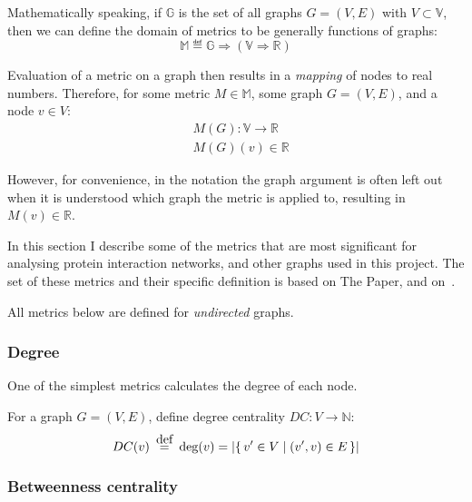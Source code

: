 Mathematically speaking, if $\mathbb{G}$ is the set of all graphs $G = (V, E)$ with $V \subset \mathbb{V}$, then we can define the domain of metrics to be generally functions of graphs:
\begin{equation}
    \label{eqn:metric_type_def}
    \mathbb{M} \eqdef \mathbb{G} \Rightarrow (\mathbb{V} \Rightarrow \mathbb{R})
\end{equation}

Evaluation of a metric on a graph then results in a \textsl{mapping} of nodes to real numbers.
Therefore, for some metric $M \in \mathbb{M}$, some graph $G = (V, E)$, and a node $v \in V$:
\begin{align}
    &M(G) : \mathbb{V} \rightarrow \mathbb{R}\\
    &M(G)(v) \in \mathbb{R}
\end{align}

However, for convenience, in the notation the graph argument is often left out when it is understood which graph the metric is applied to, resulting in $M(v) \in \mathbb{R}$.

\parspace

In this section I describe some of the metrics that are most significant for analysing protein interaction networks, and other graphs used in this project.
The set of these metrics and their specific definition is based on The Paper\cite{Bozhilova2019}, and on~\cite{MartinHernandez2011}.

All metrics below are defined for \textsl{undirected} graphs.

\subsubsection{Degree}

One of the simplest metrics calculates the degree of each node.

\begin{definition}
    For a graph $G = (V, E)$, define degree centrality $DC : V \rightarrow \mathbb{N}$:
    \begin{equation*}
        DC(v) \eqdef \deg(v) = \left| \Set{v' \in V}{(v', v) \in E} \right|
    \end{equation*}
\end{definition}

\subsubsection{Betweenness centrality}

